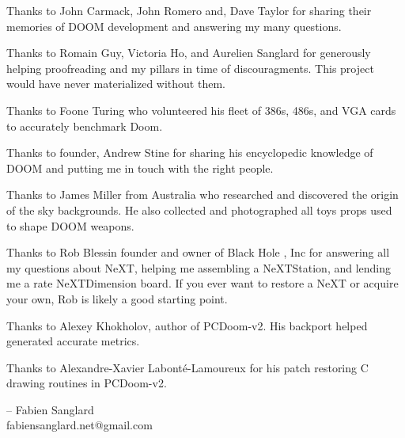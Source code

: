 Thanks to John Carmack, John Romero and, Dave Taylor for sharing their memories of DOOM development and answering my many questions.\\
\par
Thanks to Romain Guy, Victoria Ho, and Aurelien Sanglard for generously helping proofreading and my pillars in time of discouragments. This project would have never materialized without them.\\ 
\par
Thanks to Foone Turing who volunteered his fleet of 386s, 486s, and VGA cards to accurately benchmark Doom.\\
\par
Thanks to  founder, Andrew Stine for sharing his encyclopedic knowledge of DOOM and putting me in touch with the right people.\\
\par
Thanks to James Miller from Australia who researched and discovered the origin of the sky backgrounds. He also collected and photographed all toys props used to shape DOOM weapons.\\
\par
Thanks to Rob Blessin founder and owner of Black Hole , Inc for answering all my questions about NeXT, helping me assembling a NeXTStation, and lending me a rate NeXTDimension board. If you ever want to restore a NeXT or acquire your own, Rob is likely a good starting point.\\
\par
Thanks to Alexey Khokholov, author of PCDoom-v2. His backport helped generated accurate metrics.\\
\par
Thanks to Alexandre-Xavier Labont\'e-Lamoureux for his patch restoring C drawing routines in PCDoom-v2.\\
\par
-- Fabien Sanglard\\
fabiensanglard.net@gmail.com
